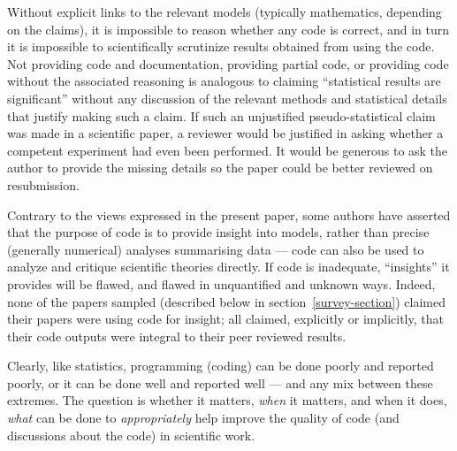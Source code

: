 Without explicit links to the relevant models (typically mathematics, depending on the claims), it is impossible to reason whether any code is correct, and in turn it is impossible to scientifically scrutinize results obtained from using the code. Not providing code and documentation, providing partial code, or providing code without the associated reasoning is analogous to claiming ``statistical results are significant'' without any discussion of the relevant methods and statistical details that justify making such a claim. If such an unjustified pseudo-statistical claim was made in a scientific paper, a reviewer would be justified in asking whether a competent experiment had even been performed. It would be generous to ask the author to provide the missing details so the paper could be better reviewed on resubmission. 

Contrary to the views expressed in the present paper, some authors have asserted that the purpose of code is to provide insight into models, rather than precise (generally numerical) analyses summarising data \cite{assessing-quality} --- code can also be used to analyze and critique scientific theories directly. If code is inadequate, ``insights'' it provides will be flawed, and flawed in unquantified and unknown ways. Indeed, none of the papers sampled (described below in section~\ref{survey-section}) claimed their papers were using code for insight; all claimed, explicitly or implicitly, that their code outputs were integral to their peer reviewed results.

Clearly, like statistics, programming (coding) can be done poorly and reported poorly, or it can be done well and reported well --- and any mix between these extremes. The question is whether it matters, \emph{when\/} it matters, and when it does, \emph{what\/} can be done to \emph{appropriately\/} help improve the quality of code (and discussions about the code) in scientific work.


